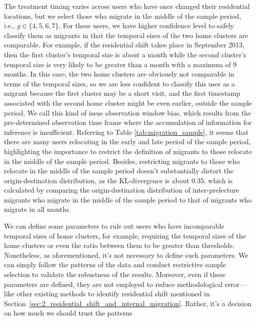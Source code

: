 The treatment timing varies across users who have once changed their residential locations, but we select those who migrate in the middle of the sample period, i.e., $g \in \{4,5,6,7\}$.
For these users, we have higher confidence level to safely classify them as migrants in that the temporal sizes of the two home clusters are comparable.
For example, if the residential shift takes place in September 2013, then the first cluster's temporal size is about a month while the second cluster's temporal size is very likely to be greater than a month with a maximum of 9 months.
In this case, the two home clusters are obviously not comparable in terms of the temporal sizes, so we are less confident to classify this user as a migrant because the first cluster may be a short visit, and the first timestamp associated with the second home cluster might be even earlier, outside the sample period.
We call this kind of issue observation window bias, which results from the pre-determined observation time frame where the accumulation of information for inference is insufficient.
Referring to Table \ref{tab:migration_sample}, it seems that there are many users relocating in the early and late period of the sample period, highlighting the importance to restrict the definition of migrants to those relocate in the middle of the sample period.
Besides, restricting migrants to those who relocate in the middle of the sample period doesn't substantially distort the origin-destination distribution, as the KL-divergence is about 0.35, which is calculated by comparing the origin-destination distribution of inter-prefecture migrants who migrate in the middle of the sample period to that of migrants who migrate in all months.

We can define some parameters to rule out users who have incomparable temporal sizes of home clusters, for example, requiring the temporal sizes of the home clusters or even the ratio between them to be greater than thresholds.
Nonetheless, as aforementioned, it's not necessary to define such parameters.
We can simply follow the patterns of the data and conduct restrictive sample selection to validate the robustness of the results.
Moreover, even if these parameters are defined, they are not employed to reduce methodological error—like other existing methods to identify residential shift mentioned in Section~\ref{sec:2_residential_shift_and_internal_migration}.
Rather, it's a decision on how much we should trust the patterns


